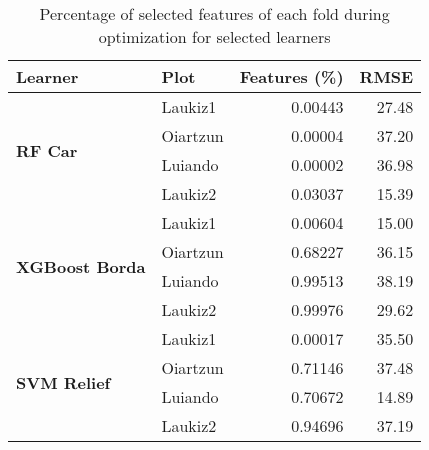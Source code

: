 \begin{table}[ht!]
\centering
\caption{Percentage of selected features of each fold during optimization for selected learners} 
\label{tab:tune-perc-sel-features}
\begin{tabular}{llrr}
  \toprule
Learner & Plot & Features (\%) & RMSE \\ 
  \midrule
\midrule\multirow{4}{*}{\textbf{RF Car}} & Laukiz1 & 0.00443 & 27.48 \\ 
   & Oiartzun & 0.00004 & 37.20 \\ 
   & Luiando & 0.00002 & 36.98 \\ 
   & Laukiz2 & 0.03037 & 15.39 \\ 
  \midrule\multirow{4}{*}{\textbf{XGBoost Borda}} & Laukiz1 & 0.00604 & 15.00 \\ 
   & Oiartzun & 0.68227 & 36.15 \\ 
   & Luiando & 0.99513 & 38.19 \\ 
   & Laukiz2 & 0.99976 & 29.62 \\ 
  \midrule\multirow{4}{*}{\textbf{SVM Relief}} & Laukiz1 & 0.00017 & 35.50 \\ 
   & Oiartzun & 0.71146 & 37.48 \\ 
   & Luiando & 0.70672 & 14.89 \\ 
   & Laukiz2 & 0.94696 & 37.19 \\ 
   \bottomrule
\end{tabular}
\end{table}
